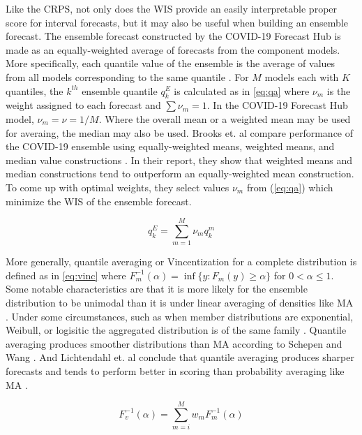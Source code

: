 \documentclass[11pt,notitlepage]{isuthesis}
\begin{document}
Like the CRPS, not only does the WIS provide an easily interpretable proper 
score for interval forecasts, but it may also be useful when building an 
ensemble forecast.
The ensemble forecast constructed by the COVID-19 Forecast Hub is made as an
equally-weighted average of forecasts from the component models. More 
specifically, each quantile value of the ensemble is the average of values from
all models corresponding to the same quantile \cite[]{ray2020ensemble}. For $M$ 
models each with $K$ quantiles, the $k^{th}$ ensemble quantile $q^E_k$ is 
calculated as in \eqref{eq:qa}
where $\nu_m$ is the weight assigned to each forecast and $\sum \nu_m = 1$. In
the COVID-19 Forecast Hub model, $\nu_m = \nu = 1/M$. Where the overall mean or 
a weighted mean may be used for averaing, the median may also be used.
Brooks et. al compare performance of the COVID-19 ensemble
using equally-weighted means, weighted means, and median value constructions
\cite[]{brooks2020comparing}.
In their report, they show that weighted means and median constructions tend
to outperform an equally-weighted mean construction. To come up with optimal 
weights, they select values $\nu_m$ from (\ref{eq:qa}) which minimize the WIS of 
the ensemble forecast.


\begin{equation}
\label{eq:qa}
  q^E_k = \sum_{m=1}^M \nu_m q_k^m 
\end{equation}



More generally, quantile averaging or Vincentization for a complete distribution 
is defined as
in \eqref{eq:vinc}
where $F_m^{-1} (\alpha) = \inf \{y:F_m(y) \geq \alpha\}$ for 
$0 < \alpha \leq 1$. Some notable characteristics are that it is more likely for
the ensemble distribution
to be unimodal than it is under linear averaging of densities like MA 
\cite[]{busetti2017quantile}. Under some circumstances, such as when member
distributions are exponential, Weibull, or logisitic the aggregated distribution
is of the same family \cite[]{ratcliff1979group}. Quantile averaging produces 
smoother
distributions than MA according to Schepen and Wang \cite[]{schepen2015model}.
And Lichtendahl et. al conclude that quantile averaging produces sharper 
forecasts
and tends to perform better in scoring than probability averaging like MA
\cite[]{lichtendahl2013better}.

\begin{equation}
\label{eq:vinc}
  F_v^{-1}(\alpha) = \sum_{m=i}^M w_m F_m^{-1} (\alpha)
\end{equation}
\end{document}
